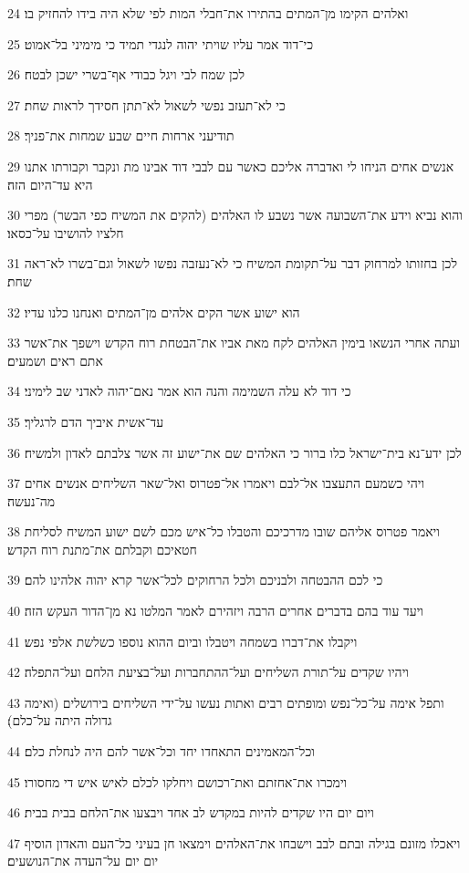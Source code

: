 \par 24 ואלהים הקימו מן־המתים בהתירו את־חבלי המות לפי שלא היה בידו להחזיק בו׃
\par 25 כי־דוד אמר עליו שויתי יהוה לנגדי תמיד כי מימיני בל־אמוט׃
\par 26 לכן שמח לבי ויגל כבודי אף־בשרי ישכן לבטח׃
\par 27 כי לא־תעזב נפשי לשאול לא־תתן חסידך לראות שחת׃
\par 28 תודיעני ארחות חיים שבע שמחות את־פניך׃
\par 29 אנשים אחים הניחו לי ואדברה אליכם כאשר עם לבבי דוד אבינו מת ונקבר וקבורתו אתנו היא עד־היום הזה׃
\par 30 והוא נביא וידע את־השבועה אשר נשבע לו האלהים (להקים את המשיח כפי הבשר) מפרי חלציו להושיבו על־כסאו׃
\par 31 לכן בחזותו למרחוק דבר על־תקומת המשיח כי לא־נעזבה נפשו לשאול וגם־בשרו לא־ראה שחת׃
\par 32 הוא ישוע אשר הקים אלהים מן־המתים ואנחנו כלנו עדיו׃
\par 33 ועתה אחרי הנשאו בימין האלהים לקח מאת אביו את־הבטחת רוח הקדש וישפך את־אשר אתם ראים ושמעים׃
\par 34 כי דוד לא עלה השמימה והנה הוא אמר נאם־יהוה לאדני שב לימיני׃
\par 35 עד־אשית איביך הדם לרגליך׃
\par 36 לכן ידע־נא בית־ישראל כלו ברור כי האלהים שם את־ישוע זה אשר צלבתם לאדון ולמשיח׃
\par 37 ויהי כשמעם התעצבו אל־לבם ויאמרו אל־פטרוס ואל־שאר השליחים אנשים אחים מה־נעשה׃
\par 38 ויאמר פטרוס אליהם שובו מדרכיכם והטבלו כל־איש מכם לשם ישוע המשיח לסליחת חטאיכם וקבלתם את־מתנת רוח הקדש׃
\par 39 כי לכם ההבטחה ולבניכם ולכל הרחוקים לכל־אשר קרא יהוה אלהינו להם׃
\par 40 ויעד עוד בהם בדברים אחרים הרבה ויזהירם לאמר המלטו נא מן־הדור העקש הזה׃
\par 41 ויקבלו את־דברו בשמחה ויטבלו וביום ההוא נוספו כשלשת אלפי נפש׃
\par 42 ויהיו שקדים על־תורת השליחים ועל־ההתחברות ועל־בציעת הלחם ועל־התפלה׃
\par 43 ותפל אימה על־כל־נפש ומופתים רבים ואתות נעשו על־ידי השליחים בירושלים (ואימה גדולה היתה על־כלם)׃
\par 44 וכל־המאמינים התאחדו יחד וכל־אשר להם היה לנחלת כלם׃
\par 45 וימכרו את־אחזתם ואת־רכושם ויחלקו לכלם לאיש איש די מחסורו׃
\par 46 ויום יום היו שקדים להיות במקדש לב אחד ויבצעו את־הלחם בבית בבית׃
\par 47 ויאכלו מזונם בגילה ובתם לבב וישבחו את־האלהים וימצאו חן בעיני כל־העם והאדון הוסיף יום יום על־העדה את־הנושעים׃

